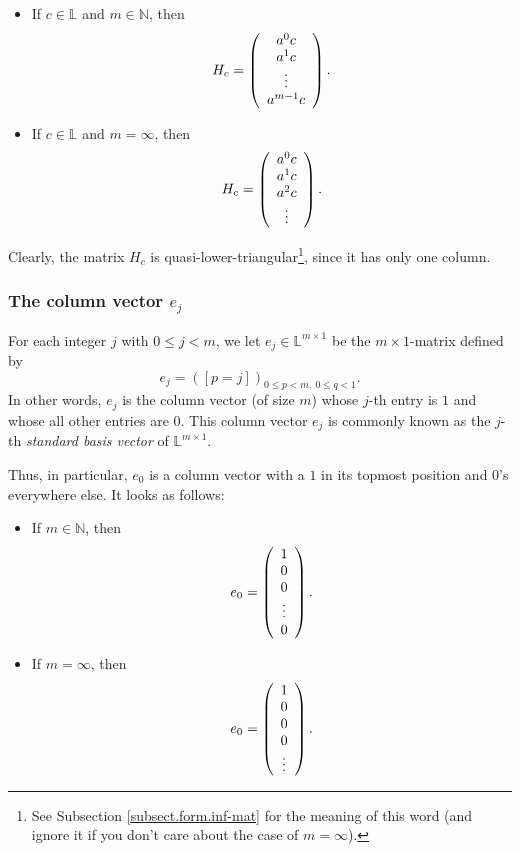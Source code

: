 \documentclass[numbers=enddot,12pt,final,onecolumn,notitlepage]{scrartcl}%
\theoremstyle{definition}
\begin{document}
\begin{itemize}
\item If $c\in\mathbb{L}$ and $m\in\mathbb{N}$, then%
\[
H_{c}=\left(
\begin{array}
[c]{c}%
a^{0}c\\
a^{1}c\\
\vdots\\
a^{m-1}c
\end{array}
\right)  .
\]


\item If $c\in\mathbb{L}$ and $m=\infty$, then%
\[
H_{c}=\left(
\begin{array}
[c]{c}%
a^{0}c\\
a^{1}c\\
a^{2}c\\
\vdots
\end{array}
\right)  .
\]

\end{itemize}

Clearly, the matrix $H_{c}$ is quasi-lower-triangular\footnote{See Subsection
\ref{subsect.form.inf-mat} for the meaning of this word (and ignore it if you
don't care about the case of $m=\infty$).}, since it has only one column.

\subsubsection{The column vector $e_{j}$}

For each integer $j$ with $0\leq j<m$, we let $e_{j}\in\mathbb{L}^{m\times1}$
be the $m\times1$-matrix defined by%
\begin{equation}
e_{j}=\left(  \left[  p=j\right]  \right)  _{0\leq p<m,\ 0\leq q<1}.
\label{eq.ej=}%
\end{equation}
In other words, $e_{j}$ is the column vector (of size $m$) whose $j$-th entry
is $1$ and whose all other entries are $0$. This column vector $e_{j}$ is
commonly known as the $j$-th \textit{standard basis vector} of $\mathbb{L}%
^{m\times1}$.

Thus, in particular, $e_{0}$ is a column vector with a $1$ in its topmost
position and $0$'s everywhere else. It looks as follows:

\begin{itemize}
\item If $m\in\mathbb{N}$, then%
\[
e_{0}=\left(
\begin{array}
[c]{c}%
1\\
0\\
0\\
\vdots\\
0
\end{array}
\right)  .
\]


\item If $m=\infty$, then%
\[
e_{0}=\left(
\begin{array}
[c]{c}%
1\\
0\\
0\\
0\\
\vdots
\end{array}
\right)  .
\]

\end{itemize}
\end{document}
